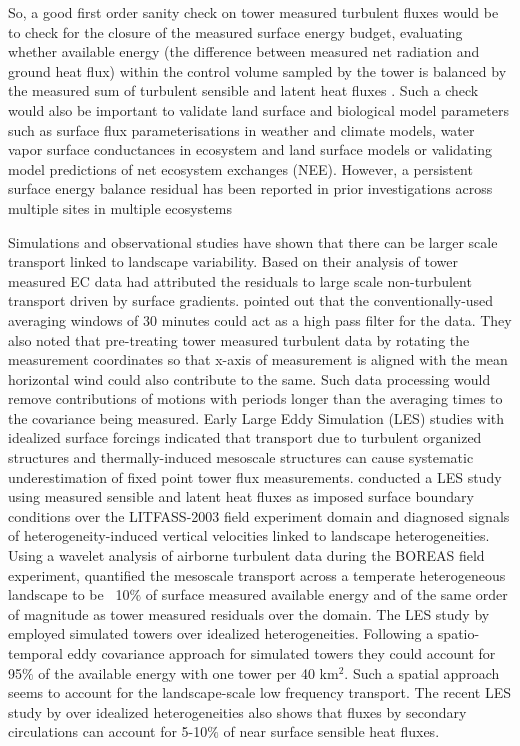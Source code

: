 \documentclass[draft]{agujournal2019}
\begin{document}
So, a good first order sanity check on tower measured turbulent fluxes would be to check for the closure of the measured surface energy budget, evaluating whether available energy (the difference between measured net radiation and ground heat flux) within the control volume sampled by the tower is balanced by the measured sum of turbulent sensible and latent heat fluxes \cite{oncley_energy_2007,foken_energy_2008, foken_energy_2010, mauder_surface-energy-balance_2020}. Such a check would also be important to validate land surface and biological model parameters such as surface flux parameterisations in weather and climate models, water vapor surface conductances in ecosystem and land surface models or validating model predictions of net ecosystem exchanges (NEE). However, a persistent surface energy balance residual has been reported in prior investigations across multiple sites in multiple ecosystems \cite{oncley_energy_2007, foken_energy_2010, mauder_surface-energy-balance_2020} 

Simulations and observational studies have shown that there can be larger scale 
transport linked to landscape variability. Based on their analysis of tower 
measured EC data  had attributed the residuals to large scale non-turbulent transport driven by surface gradients.  pointed out that the conventionally-used averaging windows of 30 minutes could act as a high pass filter for the data. They also noted that pre-treating tower measured turbulent data by rotating the measurement coordinates so that x-axis of measurement is aligned with the mean horizontal wind could also contribute to the same. Such data processing would remove contributions of motions with periods longer than the averaging times to the covariance being measured. Early Large Eddy Simulation (LES) studies \cite{kanda_les_2004,  inagaki_impact_2006, 
steinfeld_spatial_2007} with idealized surface forcings indicated that transport
due to turbulent organized structures and thermally-induced mesoscale structures can cause systematic underestimation of fixed point tower flux measurements. 
 conducted a LES study using measured sensible and latent heat fluxes as imposed surface boundary conditions over the LITFASS-2003 field experiment domain and diagnosed signals of heterogeneity-induced vertical velocities linked to landscape heterogeneities. Using a wavelet analysis of airborne turbulent data during the BOREAS field experiment,  quantified the  mesoscale transport across a temperate heterogeneous landscape to be ~10$\%$ of  surface measured available energy and of the  same order of magnitude as tower measured residuals over the domain. The LES study by  employed simulated towers over idealized heterogeneities. Following a spatio-temporal eddy covariance approach for simulated towers they could account for 95$\%$ of the available energy with one tower per 40 km$^2$. Such a spatial approach seems to account for the landscape-scale low frequency transport. The recent LES study by \cite{margairaz_surface_2020} over idealized heterogeneities also shows that fluxes by secondary circulations can account for 5-10$\%$ of near surface sensible heat fluxes.
\end{document}
